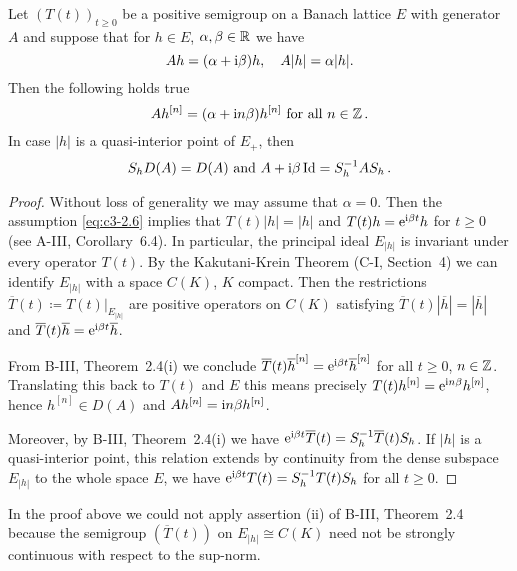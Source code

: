\begin{theorem}\label{thm:c3-2.2}
	Let $(T(t))_{t\geq 0}$ be a positive semigroup on a Banach lattice $E$ with generator $A$ and suppose that for $h \in E$, $\alpha,\beta \in \mathbb{R} $ we have
	\begin{equation}\label{eq:c3-2.6}
		Ah = (\alpha+\mathrm{i}\beta )h, \quad A|h| = \alpha|h|.
	\end{equation}
Then the following holds true
\begin{equation}\label{eq:c3-2.7}
	Ah^{[n]} = (\alpha+\mathrm{i} n\beta)h^{[n]} \text{ for all } n \in \mathbb{Z}\,.
\end{equation}
In case $|h|$ is a quasi-interior point of $E_{+}$, then 
\[
S_{h}D(A) = D(A) \text{ and } A + \mathrm{i}\beta \operatorname{Id} = S_{h}^{-1}AS_{h}\,.
\]
\end{theorem}
\begin{proof}
	Without loss of generality we may assume that $\alpha = 0$.
	Then the assumption \eqref{eq:c3-2.6} implies that $T(t)|h| = |h|$ and $T(t)h = \mathrm{e}^{\mathrm{i}\beta t}h$ for $t \geq 0$ (see A-III, Corollary~6.4).
	In particular, the principal ideal $E_{|h|}$ is invariant under every operator $T(t)$.
	By the Kakutani-Krein Theorem (C-I, Section~4) we can identify $E_{|h|}$ with a space $C(K)$, $K$ compact.
	Then the restrictions $\overline{T}(t) \coloneq T(t)|_{E_{|h|}}$ are positive operators on $C(K)$ satisfying $\overline{T}(t)|\overline{h}| = |\overline{h}|$ and $\overline{T}(t)\overline{h} = \mathrm{e}^{\mathrm{i}\beta  t}\overline{h}$.
	
	From B-III, Theorem~2.4(i) we conclude $\overline{T}(t)\overline{h}^{[n]} = \mathrm{e}^{\mathrm{i}\beta  t}\overline{h}^{[n]}$ for all $t \geq 0$, $n \in \mathbb{Z}$.
	Translating this back to $T(t)$ and $E$ this means precisely $T(t)h^{[n]} = \mathrm{e}^{\mathrm{i} n\beta}h^{[n]}$, hence $h^{[n]} \in D(A)$ and $Ah^{[n]} = \mathrm{i}  n\beta h^{[n]}$.
	
	Moreover, by B-III, Theorem~2.4(i) we have $\mathrm{e}^{\mathrm{i}\beta  t}\overline{T}(t) = S_{h}^{-1}\overline{T}(t)S_{h}$.
	If $|h|$ is a quasi-interior point, this relation extends by continuity from the dense subspace $E_{|h|}$ to the whole space $E$, \ie  we have $\mathrm{e}^{\mathrm{i}\beta  t}T(t) = S_{h}^{-1}T(t)S_{h}$ for all $t \geq 0$.
\end{proof}
In the proof above we could not apply assertion (ii) of B-III, Theorem~2.4 because the semigroup $(\overline{T}(t))$ on $E_{|h|} \cong C(K)$ need not be strongly continuous with respect to the sup-norm.

